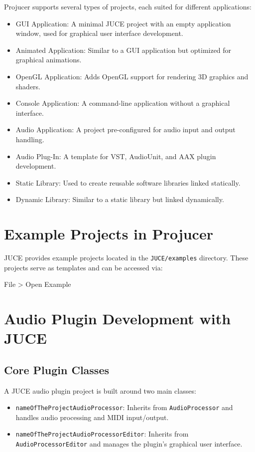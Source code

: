 Projucer supports several types of projects, each suited for different applications:

\begin{itemize}
    \item GUI Application: A minimal JUCE project with an empty application window, used for graphical user interface development.
    \item Animated Application: Similar to a GUI application but optimized for graphical animations.
    \item OpenGL Application: Adds OpenGL support for rendering 3D graphics and shaders.
    \item Console Application: A command-line application without a graphical interface.
    \item Audio Application: A project pre-configured for audio input and output handling.
    \item Audio Plug-In: A template for VST, AudioUnit, and AAX plugin development.
    \item Static Library: Used to create reusable software libraries linked statically.
    \item Dynamic Library: Similar to a static library but linked dynamically.
\end{itemize}

\section{Example Projects in Projucer}

JUCE provides example projects located in the \texttt{JUCE/examples} directory. These projects serve as templates and can be accessed via:

\begin{supercollider*}
File > Open Example
\end{supercollider*}

\section{Audio Plugin Development with JUCE}

\subsection{Core Plugin Classes}

A JUCE audio plugin project is built around two main classes:

\begin{itemize}
    \item \texttt{nameOfTheProjectAudioProcessor}: Inherits from \texttt{AudioProcessor} and handles audio processing and MIDI input/output.
    \item \texttt{nameOfTheProjectAudioProcessorEditor}: Inherits from \texttt{AudioProcessorEditor} and manages the plugin’s graphical user interface.
\end{itemize}

